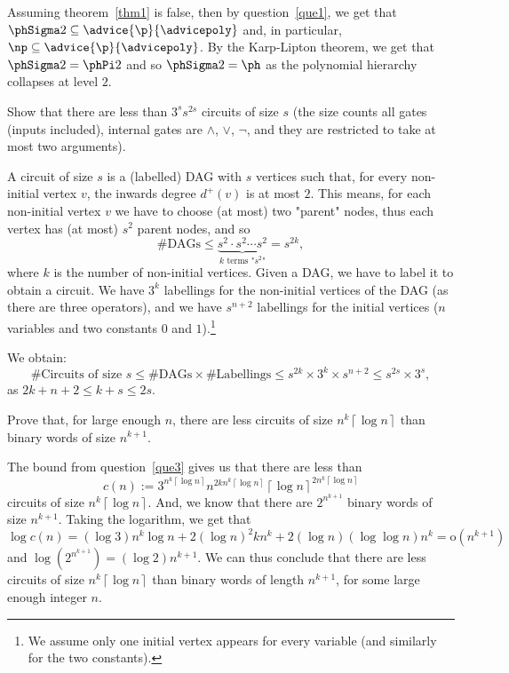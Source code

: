 \documentclass[fontsize=16pt,a4paper,DIV=17,parskip=half]{scrartcl}
\theoremstyle{definition}
\newcommand{\poly}{\advice{\p}{\advicepoly}}
\begin{document}
  Assuming theorem~\ref{thm1} is false, then by question~\ref{que1}, we get that $\phSigma 2 \subseteq \poly$ and, in particular, $\np \subseteq \poly$.
  By the Karp-Lipton theorem, we get that $\phSigma 2 = \phPi 2$ and so $\phSigma 2 = \ph$ as the polynomial hierarchy collapses at level $2$.

  \begin{que}
    Show that there are less than $3^s s^{2s}$ circuits of size $s$ (the size counts all gates (inputs included), internal gates are $\land$, $\lor$, $\lnot$, and they are restricted to take at most two arguments).
    \label{que3}
  \end{que}

  A circuit of size $s$ is a (labelled) DAG with $s$ vertices such that, for every non-initial vertex $v$, the inwards degree $d^+(v)$ is at most $2$.
  This means, for each non-initial vertex $v$ we have to choose (at most) two "parent" nodes, thus each vertex has (at most) $s^2$ parent nodes, and so
  \[
    \# \text{DAGs} \le \underbrace{s^2 \cdot s^2 \cdots s^2}_{\text{$k$ terms "$s^2$"}} = s^{2k}
  ,\]
  where $k$ is the number of non-initial vertices.
  Given a DAG, we have to label it to obtain a circuit.
  We have $3^k$ labellings for the non-initial vertices of the DAG (as there are three operators), and we have $s^{n+2}$ labellings for the initial vertices ($n$ variables and two constants $0$ and $1$).\footnote{We assume only one initial vertex appears for every variable (and similarly for the two constants).}

  We obtain:
  \[
  \# \text{Circuits of size $s$} \le \# \text{DAGs} \times \# \text{Labellings}
  \le s^{2k} \times 3^k \times s^{n+2} \le s^{2s} \times 3^s
  ,\] as $2 k + n + 2 \le k + s \le 2s$.

  \begin{que}
    Prove that, for large enough $n$, there are less circuits of size $n^k \left\lceil \log n \right\rceil$ than binary words of size $n^{k+1}$.
    \label{que4}
  \end{que}

  The bound from question~\ref{que3} gives us that there are less than
  \[
  c(n) := 3^{n^k \left\lceil \log n \right\rceil} n^{2k n^k \left\lceil \log n \right\rceil} \left\lceil \log n \right\rceil ^{2 n^k \left\lceil \log n \right\rceil}
  \]
  circuits of size $n^k \left\lceil \log n \right\rceil$.
  And, we know that there are $2^{n^{k+1}}$ binary words of size $n^{k+1}$.
  Taking the logarithm, we get that
  \[
    \log c(n) = (\log 3) n^k \log n + 2 (\log n)^2 k n^k + 2 (\log n) (\log \log n) n^k = \mathrm{o}(n^{k+1})
  \]
  and $\log \left( 2^{n^{k+1}} \right) = (\log 2) n^{k+1}$.
  We can thus conclude that there are less circuits of size $n^k \left\lceil \log n \right\rceil$ than binary words of length $n^{k+1}$, for some large enough integer $n$.
\end{document}
